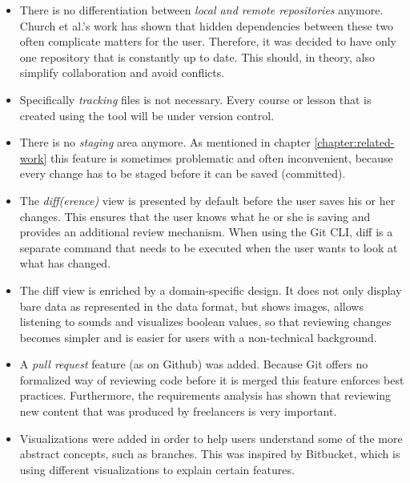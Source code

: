 \begin{itemize}
  \item There is no differentiation between \emph{local and remote repositories} anymore. Church et al.'s \cite{church_case_2014} work has shown that hidden dependencies between these two often complicate matters for the user. Therefore, it was decided to have only one repository that is constantly up to date. This should, in theory, also simplify collaboration and avoid conflicts.
  \item Specifically \emph{tracking} files is not necessary. Every course or lesson that is created using the tool will be under version control. 
  \item There is no \emph{staging} area anymore. As mentioned in chapter \ref{chapter:related-work} this feature is sometimes problematic and often inconvenient, because every change has to be staged before it can be saved (committed).
  \item The \emph{diff(erence)} view is presented by default before the user saves his or her changes. This ensures that the user knows what he or she is saving and provides an additional review mechanism. When using the Git CLI, diff is a separate command that needs to be executed when the user wants to look at what has changed.
  \item The diff view is enriched by a domain-specific design. It does not only display bare data as represented in the data format, but shows images, allows listening to sounds and visualizes boolean values, so that reviewing changes becomes simpler and is easier for users with a non-technical background.
  \item A \emph{pull request} feature (as on Github) was added. Because Git offers no formalized way of reviewing code before it is merged this feature enforces best practices. Furthermore, the requirements analysis has shown that reviewing new content that was produced by freelancers is very important.
  \item Visualizations were added in order to help users understand some of the more abstract concepts, such as branches. This was inspired by Bitbucket, which is using different visualizations to explain certain features.
\end{itemize}

